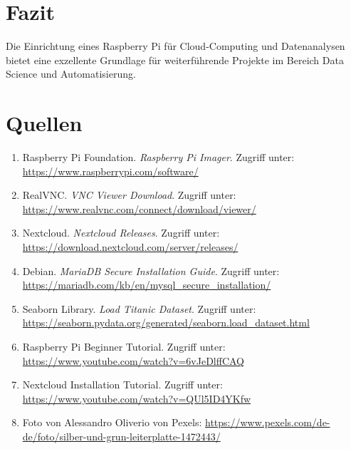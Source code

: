 \documentclass[a4paper,12pt]{article}
\begin{document}
\section{Fazit}
Die Einrichtung eines Raspberry Pi für Cloud-Computing und Datenanalysen bietet eine exzellente Grundlage für weiterführende Projekte im Bereich Data Science und Automatisierung.

\newpage
\section{Quellen}
\begin{enumerate}
    \item Raspberry Pi Foundation. \textit{Raspberry Pi Imager}. Zugriff unter: \url{https://www.raspberrypi.com/software/}
    \item RealVNC. \textit{VNC Viewer Download}. Zugriff unter: \url{https://www.realvnc.com/connect/download/viewer/}
    \item Nextcloud. \textit{Nextcloud Releases}. Zugriff unter: \url{https://download.nextcloud.com/server/releases/}
    \item Debian. \textit{MariaDB Secure Installation Guide}. Zugriff unter: \url{https://mariadb.com/kb/en/mysql_secure_installation/}
    \item Seaborn Library. \textit{Load Titanic Dataset}. Zugriff unter: \url{https://seaborn.pydata.org/generated/seaborn.load_dataset.html}
    \item Raspberry Pi Beginner Tutorial. Zugriff unter: \url{https://www.youtube.com/watch?v=6vJeDlffCAQ}
    \item Nextcloud Installation Tutorial. Zugriff unter: \url{https://www.youtube.com/watch?v=QUl5ID4YKfw}
    \item Foto von Alessandro Oliverio von Pexels: \url{https://www.pexels.com/de-de/foto/silber-und-grun-leiterplatte-1472443/}
\end{enumerate}
\end{document}
